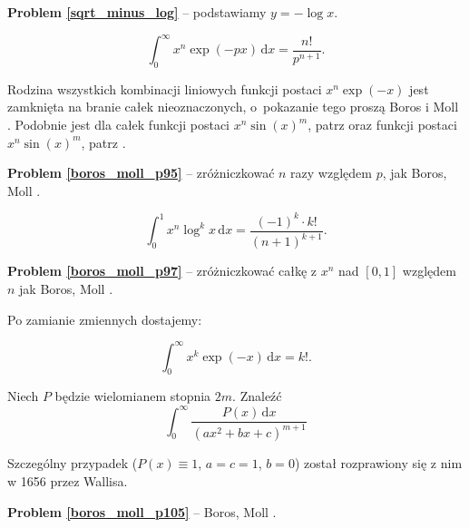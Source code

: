\textbf{Problem \ref{sqrt_minus_log}} -- podstawiamy $y = - \log x$.

\begin{problem_with_solution}
    \label{boros_moll_p95}%
    \begin{equation}
        \int_0^\infty x^n \exp (-px) \,\mathrm{d}x = \frac{n!}{p^{n+1}}.
    \end{equation}
\end{problem_with_solution}

Rodzina wszystkich kombinacji liniowych funkcji postaci $x^n \exp (-x)$ jest zamknięta na branie całek nieoznaczonych, o~pokazanie tego proszą Boros i Moll \cite[s. 103]{boros04}.
Podobnie jest dla całek funkcji postaci $x^n \sin(x)^m$, patrz \cite[s. 135]{boros04} oraz funkcji postaci  $x^n \sin(x)^m$, patrz  \cite[s. 136]{boros04}. %

\textbf{Problem \ref{boros_moll_p95}} -- zróżniczkować $n$ razy względem $p$, jak Boros, Moll \cite[s. 95]{boros04}.

\begin{problem_with_solution}
    \label{boros_moll_p97}%
    \begin{equation}
        \int_0^1 x^n \log^k x \,\mathrm{d}x = \frac{(-1)^k \cdot k!}{(n+1)^{k+1}}.
    \end{equation}
\end{problem_with_solution}

\textbf{Problem \ref{boros_moll_p97}} -- zróżniczkować całkę z $x^n$ nad $[0, 1]$ względem $n$ jak Boros, Moll \cite[s. 97]{boros04}.

Po zamianie zmiennych dostajemy:

\begin{problem}
    \begin{equation}
        \int_0^\infty x^k \exp (-x) \,\mathrm{d}x = k!.
    \end{equation}
\end{problem}


\begin{problem_with_solution}
    Niech $P$ będzie wielomianem stopnia $2m$. Znaleźć
    \label{boros_moll_p105}%
    \begin{equation}
        \int_0^\infty \frac{P(x) \,\mathrm{d}x}{(ax^2 + bx + c)^{m+1}}
    \end{equation}
\end{problem_with_solution}

Szczególny przypadek ($P(x) \equiv 1$, $a = c = 1$, $b = 0$) został rozprawiony się z nim w 1656 przez Wallisa.

\textbf{Problem \ref{boros_moll_p105}} -- Boros, Moll \cite[s. 105--koniecrozdziału6]{boros04}.
